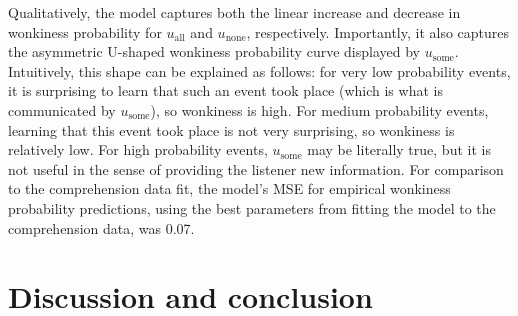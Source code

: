 \documentclass[10pt,letterpaper]{article}
\newcommand{\red}[1]{\textcolor{Red}{#1}}
\begin{document}
Qualitatively, the model captures both the linear increase and decrease in wonkiness probability for $u_{\textrm{all}}$ and $u_{\textrm{none}}$, respectively. Importantly, it also captures the asymmetric U-shaped wonkiness probability curve displayed by $u_{\textrm{some}}$. Intuitively, this shape can be explained as follows: for very low probability events, it is surprising to learn that such an event took place (which is what is communicated by $u_{\textrm{some}}$), so wonkiness is high. For medium probability events, learning that this event took place is not very surprising, so wonkiness is relatively low. For high probability events, $u_{\textrm{some}}$ may be literally true, but it is not useful in the sense of providing the listener new information. For comparison to the comprehension data fit, the model's MSE for empirical wonkiness probability predictions, using the best parameters from fitting the model to the comprehension data, was 0.07. 











\section{Discussion and conclusion}


\end{document}
